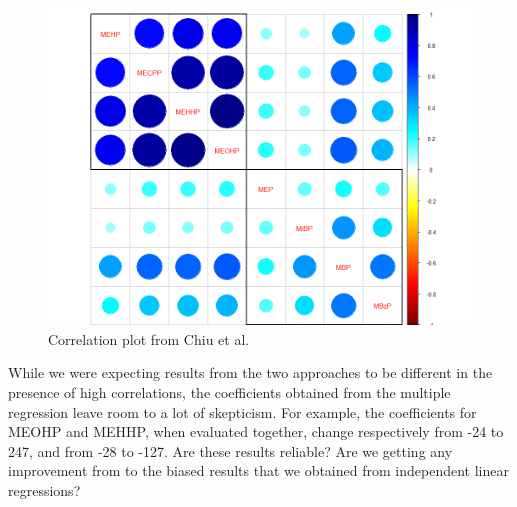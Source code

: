 \documentclass[
]{book}
\begin{document}
\begin{figure}
\centering
\includegraphics{images/Rplot02.png}
\caption{Correlation plot from Chiu et al.}
\end{figure}

While we were expecting results from the two approaches to be different in the presence of high correlations, the coefficients obtained from the multiple regression leave room to a lot of skepticism. For example, the coefficients for MEOHP and MEHHP, when evaluated together, change respectively from -24 to 247, and from -28 to -127. Are these results reliable? Are we getting any improvement from to the biased results that we obtained from independent linear regressions?
\end{document}
